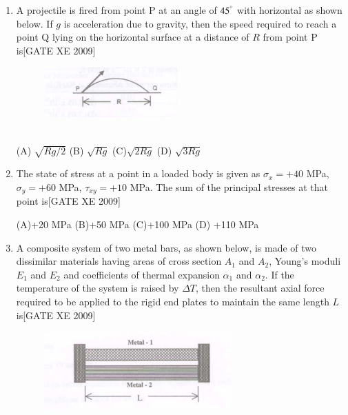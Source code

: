\documentclass[journal,12pt,onecolumn]{IEEEtran}
\theoremstyle{remark}
\begin{document}
\begin{enumerate}
\noindent
\item A projectile is fired from point P at an angle of $45^\degree$ with horizontal as shown below. If $g$ is acceleration due to gravity, then the speed required to reach a point Q lying on the horizontal surface at a distance of $R$ from point P is\hfill[GATE XE 2009]
\begin{figure}[h]
\centering
   \includegraphics[width=0.5\columnwidth]{figs/fig7.png}
    \end{figure}\\

   (A)  $\sqrt{Rg/2}$  \hfill
   (B)  $\sqrt{Rg}$  \hfill
    (C)$\sqrt{2Rg}$  \hfill 
    (D) $\sqrt{3Rg}$ \hfill




\noindent
\item The state of stress at a point in a loaded body is given as $\sigma_x = +40$ MPa, $\sigma_y = +60$ MPa, $\tau_{xy} = +10$ MPa. The sum of the principal stresses at that point is\hfill[GATE XE 2009]

     (A)+20 MPa \hfill
     (B)+50 MPa  \hfill
     (C)+100 MPa \hfill
    (D) +110 MPa




\noindent
\item A composite system of two metal bars, as shown below, is made of two dissimilar materials having areas of cross section $A_1$ and $A_2$, Young's moduli $E_1$ and $E_2$ and coefficients of thermal expansion $\alpha_1$ and $\alpha_2$. If the temperature of the system is raised by $\Delta T$, then the resultant axial force required to be applied to the rigid end plates to maintain the same length $L$ is\hfill[GATE XE 2009]
\begin{figure}[h]
    \centering
     \includegraphics[width=0.5\columnwidth]{figs/fig8.png}
\end{figure}

\begin{enumerate}


\end{enumerate}
\end{enumerate}
\end{document}
